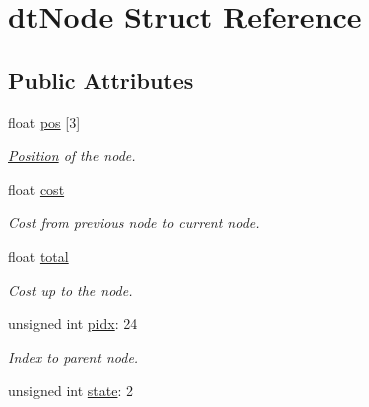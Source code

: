 \hypertarget{structdtNode}{}\section{dt\+Node Struct Reference}
\label{structdtNode}
\subsection*{Public Attributes}
\begin{DoxyCompactItemize}
\item 
\mbox{\label{structdtNode_a7fc5d3a33de093fea1785541d97e4427}} 
float \hyperlink{structdtNode_a7fc5d3a33de093fea1785541d97e4427}{pos} \mbox{[}3\mbox{]}
\begin{DoxyCompactList}\small\item\em \hyperlink{structPosition}{Position} of the node. \end{DoxyCompactList}\item 
\mbox{\label{structdtNode_a253defdaa9ea8dbe9ea5991bcfb75b32}} 
float \hyperlink{structdtNode_a253defdaa9ea8dbe9ea5991bcfb75b32}{cost}
\begin{DoxyCompactList}\small\item\em Cost from previous node to current node. \end{DoxyCompactList}\item 
\mbox{\label{structdtNode_aed27a8d0170505d1dba0cd3201bc6536}} 
float \hyperlink{structdtNode_aed27a8d0170505d1dba0cd3201bc6536}{total}
\begin{DoxyCompactList}\small\item\em Cost up to the node. \end{DoxyCompactList}\item 
\mbox{\label{structdtNode_af9b33590451ca71942c251e140724d49}} 
unsigned int \hyperlink{structdtNode_af9b33590451ca71942c251e140724d49}{pidx}\+: 24
\begin{DoxyCompactList}\small\item\em Index to parent node. \end{DoxyCompactList}\item 
\mbox{\label{structdtNode_a9ac33b320a8736d5d8f3f109b1b50bf1}} 
unsigned int \hyperlink{structdtNode_a9ac33b320a8736d5d8f3f109b1b50bf1}{state}\+: 2

\end{DoxyCompactItemize}
